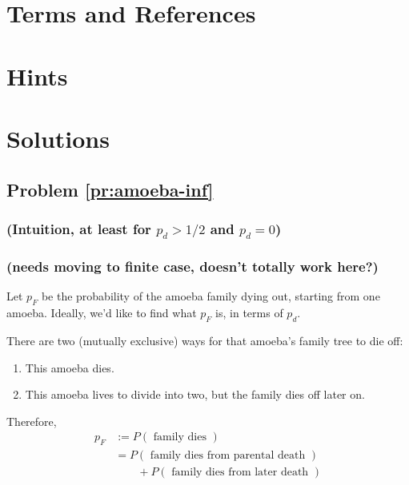\newpage
\section{Terms and References}

\section{Hints}

\newpage
\section{Solutions}

\subsection{Problem \ref{pr:amoeba-inf}}



\subsubsection{(Intuition, at least for $p_d > 1/2$ and $p_d = 0$)}

\subsubsection{(needs moving to finite case, doesn't totally work here?)}

Let $p_F$ be the probability of the amoeba family dying out, starting from one amoeba. Ideally, we'd like to find what $p_F$ is, in terms of $p_d$. 

There are two (mutually exclusive) ways for that amoeba's family tree to die off: 
\begin{enumerate}
\item This amoeba dies.
\item This amoeba lives to divide into two, but the family dies off later on.
\end{enumerate} \hfill

Therefore, 
\begin{align*}
p_F &:= P(\text{ family dies }) \\
&= P(\text{ family dies from parental death }) \\
&\qquad + P(\text{ family dies from later death }) \\ %
\end{align*}

